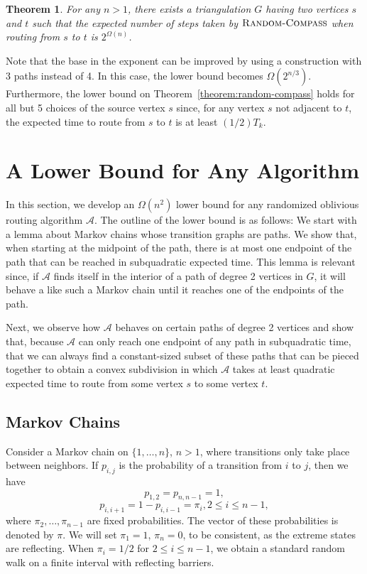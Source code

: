\documentclass [letterpaper] {patmorin}
\newtheorem{theorem}{Theorem}%
\begin{document}
\begin{theorem}
For any $n>1$, there exists a triangulation $G$ having two vertices $s$ and $t$ such that the expected number of steps taken by $\textsc{Random-Compass}$ when routing from $s$ to $t$ is $2^{\Omega(n)}$.
\end{theorem}

Note that the base in the exponent can be improved by using a
construction with 3 paths instead of 4.  In this case, the lower
bound becomes $\Omega(2^{n/3})$.  Furthermore, the lower bound on
Theorem~\ref{theorem:random-compass} holds for all but 5 choices of
the source vertex $s$ since, for any vertex $s$ not adjacent to $t$,
the expected time to route from $s$ to $t$ is at least $(1/2)T_k$.

\section{A Lower Bound for Any Algorithm}

In this section, we develop an $\Omega(n^2)$ lower bound for any randomized oblivious routing algorithm $\mathcal{A}$.  The outline of the lower bound is as follows:  We start with a lemma about Markov chains whose transition graphs are paths. We show that, when starting at the midpoint of the path, there is at most one endpoint of the path that can be reached in subquadratic expected time.  This lemma is relevant since, if $\mathcal{A}$ finds itself in the interior of a path of degree 2 vertices in $G$, it will behave a like such a Markov chain until it reaches one of the endpoints of the path.

Next, we observe how $\mathcal{A}$ behaves on certain paths of degree 2 vertices and show that, because $\mathcal{A}$ can only reach one endpoint of any path in subquadratic time, that we can always find a constant-sized subset of these paths that can be pieced together to obtain a convex subdivision in which $\mathcal{A}$ takes at least quadratic expected time to route from some vertex $s$ to some vertex $t$.

\subsection{Markov Chains}
\label{sec:markov}

Consider a Markov chain on $\{ 1, \ldots, n \}$, $n > 1$, where transitions only
take place between neighbors. If $p_{i,j}$ is the probability of a transition
from $i$ to $j$, then we have 
\[
p_{1,2} = p_{n,n-1} = 1,
\]
\[
p_{i,i+1} = 1-p_{i,i-1} = \pi_i, 2 \le i \le n-1,
\]
where $\pi_2, \ldots, \pi_{n-1}$ are fixed probabilities.
The vector of these probabilities is denoted by $\pi$.
We will set $\pi_1 = 1$, $\pi_n = 0$, to be consistent, as the
extreme states are reflecting.  When $\pi_i = 1/2$ for $2 \le i \le n-1$,
we obtain a standard random walk on a finite interval with reflecting barriers.
\end{document}
